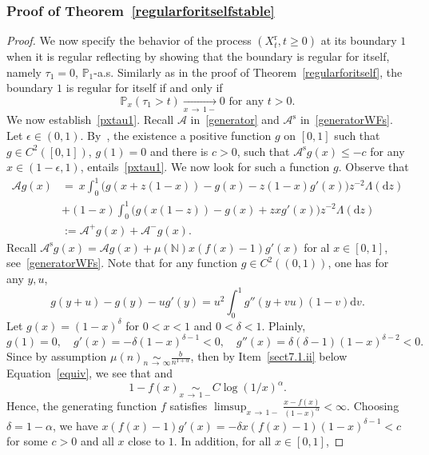\documentclass[10pt]{amsart}
\theoremstyle{definition}\newtheorem{defi}[theo]{Definition}\newtheorem{rema}[theo]{Remark}\newtheorem{exam}[theo]{Example}\newtheorem{exem}[theo]{Example}\newtheorem{nota}[theo]{Notation}
\newcommand{\ddr}{\mathrm{d}}
\newcommand{\rmr}{\mathrm{r}}
\newcommand{\rms}{\mathrm{s}}
\newcommand{\bbN}{\mathbb{N}}
\newcommand{\bbP}{\mathbb{P}}
\newcommand{\clA}{\mathcal{A}}
\begin{document}
\subsubsection{Proof of Theorem~\ref{regularforitselfstable}}

\begin{proof}
We now specify the behavior of the process $(X_t^{\rmr},t\geq 0)$ at its boundary $1$ when it is regular reflecting by showing that the boundary is regular for itself, namely $\tau_1=0$, $\bbP_1$-a.s. Similarly as in the proof of Theorem~\ref{regularforitself}, the boundary $1$ is regular for itself if and only if
\begin{equation}\label{pxtau1}
\bbP_x(\tau_1>t)\underset{x\,\rightarrow\,1-}{\longrightarrow} 0 \text{ for any } t>0.
\end{equation}
We now establish~\eqref{pxtau1}. Recall $\clA$ in~\eqref{generator} and $\clA^{\rms}$ in~\eqref{generatorWFs}. Let $\epsilon\in (0,1)$. By~\cite[Proposition~6.3.2, p.~281]{MarkovProcessesSemigroupsandGenerators}, the existence a positive function $g$ on $[0,1]$ such that $g\in C^{2}([0,1])$, $g(1)=0$ and there is $c>0$, such that $\clA^{\rms}g(x)\leq -c$ for any $x\in (1-\epsilon,1)$, entails~\eqref{pxtau1}. We now look for such a function $g$. Observe that
\begin{align*}
\clA g(x) &=  \ x\int_{0}^{1}\big(g(x+z(1-x))-g(x)-z(1-x)g'(x)\big) z^{-2}\Lambda(\ddr z)\\
&+(1-x)\int_{0}^{1}\big(g(x(1-z))-g(x)+zxg'(x)\big) z^{-2}\Lambda(\ddr z)\\
&:=\clA^{+}g(x)+\clA^{-}g(x).
\end{align*}
Recall $\clA^{\rms}g(x)=\clA g(x)+\mu(\bbN)x(f(x)-1)g'(x)$ for al $x\in [0,1]$, see~\eqref{generatorWFs}. Note that for any function $g\in C^{2}((0,1))$, one has for any $y, u$,
\[
g(y+u)-g(y)-ug'(y)=u^2\int_0^1 g''(y+vu)(1-v)\ddr v.
\]
Let $g(x)= (1-x)^\delta$ for $0<x<1$ and $0<\delta<1$. Plainly,
\[
g(1)=0,\quad g'(x)= -\delta(1-x)^{\delta-1}<0, \quad g''(x)=\delta(\delta-1)(1-x)^{\delta-2}<0.
\]
Since by assumption $\mu(n)\underset{n\,\rightarrow \,\infty}{\sim} \frac{b}{n^{1+\alpha}}$, then by Item~\eqref{sect7.1.ii} below Equation~\eqref{equiv}, we see that and
\[
1-f(x) \underset{x\,\rightarrow\,1-}{\sim} C\log(1/x)^{\alpha}.
\]
Hence, the generating function $f$ satisfies $\limsup_{x\,\rightarrow\,1-}\frac{x-f(x)}{(1-x)^\alpha}<\infty$. Choosing $\delta=1-\alpha$, we have $x(f(x)-1)g'(x) =-\delta x(f(x)-1)(1-x)^{\delta-1}<c$ for some $c>0$ and all $x$ close to $1$. In addition, for all $x\in [0,1]$,

\end{proof}
\end{document}
